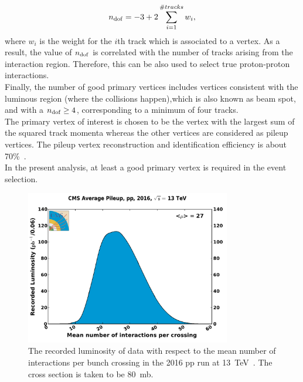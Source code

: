 \begin{equation}
    n_{\rm dof} = -3 + 2 \sum\limits_{i=1}^{\# tracks} w_i ,
\end{equation}
where $w_i$ is the weight for the $i$th track which is associated to a vertex. As a result, the value of $n_{\rm dof}$ is correlated with the number of tracks arising from the interaction region. Therefore, this can be also used to select true proton-proton interactions.\\
Finally, the number of good primary vertices includes vertices consistent with the luminous region (where the collisions happen),which is also known as beam spot, and with a $n_{\rm dof}\geq4$, corresponding to a minimum of four tracks.\\
The primary vertex of interest is chosen to be the vertex with the largest sum of the squared track momenta whereas the other vertices are considered as pileup vertices. The pileup vertex reconstruction and identification efficiency is about 70\%~\cite{JME2008}.\\
In the present analysis, at least a good primary vertex is required in the event selection.
\label{sec:PV}
\begin{figure}
\begin{center}
\includegraphics[width=0.8\textwidth]{Plots/CMS/pileup_pp_2016.pdf}
\caption[The mean number of interactions per bunch crossing]{\label{fig:CMSpileup} 
The recorded luminosity of data with respect to the mean number of interactions per bunch crossing in the 2016 pp run at 13~TeV~\cite{pileupCMS}. The cross section is taken to be 80~mb.}
\end{center}
\end{figure}
